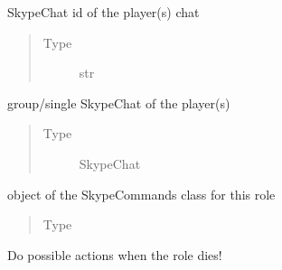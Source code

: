 \documentclass[letterpaper,10pt,english]{sphinxmanual}
\begin{document}
\begin{fulllineitems}
\begin{fulllineitems}
\begin{quote}
\begin{description}
\end{description}\end{quote}

\end{fulllineitems}



\begin{fulllineitems}
SkypeChat id of the player(s) chat
\begin{quote}\begin{description}
\item[{Type}] \leavevmode
str

\end{description}\end{quote}

\end{fulllineitems}



\begin{fulllineitems}
group/single SkypeChat of the player(s)
\begin{quote}\begin{description}
\item[{Type}] \leavevmode
SkypeChat

\end{description}\end{quote}

\end{fulllineitems}



\begin{fulllineitems}
object of the SkypeCommands class for this role
\begin{quote}\begin{description}
\item[{Type}] \leavevmode
{\hyperref[\detokenize{chatwolf:chatwolf.skypecommands.SkypeCommands}]{}}

\end{description}\end{quote}

\end{fulllineitems}



\begin{fulllineitems}
Do possible actions when the role dies!


\end{fulllineitems}
\end{fulllineitems}
\end{document}
